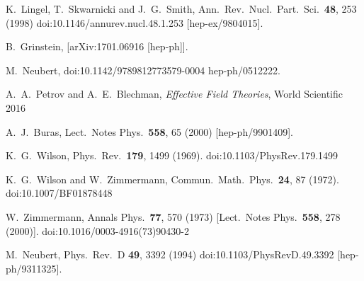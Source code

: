 \begin{thebibliography}{99}
  K.~Lingel, T.~Skwarnicki and J.~G.~Smith,
  Ann.\ Rev.\ Nucl.\ Part.\ Sci.\  {\bf 48}, 253 (1998)
  doi:10.1146/annurev.nucl.48.1.253
  [hep-ex/9804015].
  
 B.~Grinstein,
 [arXiv:1701.06916 [hep-ph]].
 
  M.~Neubert,
  doi:10.1142/9789812773579-0004
  hep-ph/0512222.


  A.~A.~Petrov and A.~E.~Blechman,
  \textit{Effective Field Theories}, 
  World Scientific 2016
  
  A.~J.~Buras,
  Lect.\ Notes Phys.\  {\bf 558}, 65 (2000)
  [hep-ph/9901409].
  
  K.~G.~Wilson,
  Phys.\ Rev.\  {\bf 179}, 1499 (1969).
  doi:10.1103/PhysRev.179.1499
  
  K.~G.~Wilson and W.~Zimmermann,
  Commun.\ Math.\ Phys.\  {\bf 24}, 87 (1972).
  doi:10.1007/BF01878448
    
  W.~Zimmermann,
  Annals Phys.\  {\bf 77}, 570 (1973)
  [Lect.\ Notes Phys.\  {\bf 558}, 278 (2000)].
  doi:10.1016/0003-4916(73)90430-2

  M.~Neubert,
  Phys.\ Rev.\ D {\bf 49}, 3392 (1994)
  doi:10.1103/PhysRevD.49.3392
  [hep-ph/9311325].
  

\end{thebibliography}
